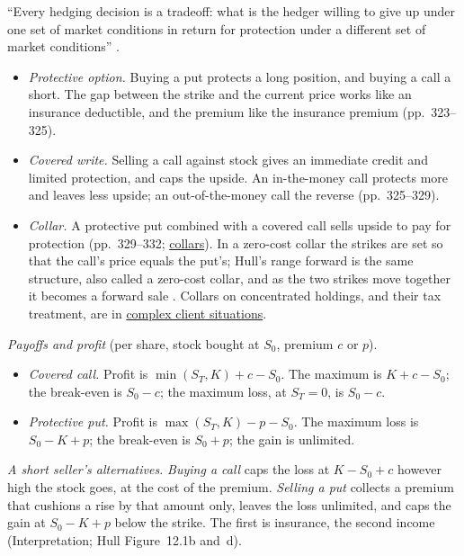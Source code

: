 \begin{qfmethod}\label{meth:covered-call-protective-put}
 ``Every hedging decision is a tradeoff: what is the hedger willing to give up under one set of market conditions in return for protection under a different set of market conditions'' \citep[chap.~17, p.~323]{s7-natenberg}.
\begin{itemize}
\item \emph{Protective option.} Buying a put protects a long position, and buying a call a short. The gap between the strike and the current price works like an insurance deductible, and the premium like the insurance premium (pp.~323--325).
\item \emph{Covered write.} Selling a call against stock gives an immediate credit and limited protection, and caps the upside. An in-the-money call protects more and leaves less upside; an out-of-the-money call the reverse (pp.~325--329).
\item \emph{Collar.} A protective put combined with a covered call sells upside to pay for protection (pp.~329--332; \hyperref[meth:option-spreads-volatility-strategies]{collars}). In a zero-cost collar the strikes are set so that the call's price equals the put's; Hull's range forward is the same structure, also called a zero-cost collar, and as the two strikes move together it becomes a forward sale \citep[chap.~17, sec.~17.2, pp.~387--389; chap.~26, sec.~26.1, p.~615 and n.~1]{s7-hulloptions}. Collars on concentrated holdings, and their tax treatment, are in \hyperref[meth:complex-client-situations]{complex client situations}.
\end{itemize}

\emph{Payoffs and profit} (per share, stock bought at $S_0$, premium $c$ or $p$).
\begin{itemize}
\item \emph{Covered call.} Profit is $\min(S_T,K)+c-S_0$. The maximum is $K+c-S_0$; the break-even is $S_0-c$; the maximum loss, at $S_T=0$, is $S_0-c$.
\item \emph{Protective put.} Profit is $\max(S_T,K)-p-S_0$. The maximum loss is $S_0-K+p$; the break-even is $S_0+p$; the gain is unlimited.
\end{itemize}

\emph{A short seller's alternatives.} \emph{Buying a call} caps the loss at $K-S_0+c$ however high the stock goes, at the cost of the premium. \emph{Selling a put} collects a premium that cushions a rise by that amount only, leaves the loss unlimited, and caps the gain at $S_0-K+p$ below the strike. The first is insurance, the second income (Interpretation; Hull Figure~12.1b and~d).


\end{qfmethod}
